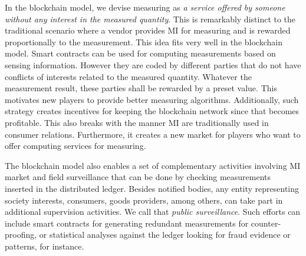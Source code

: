 \documentclass[journal]{IEEEtran}
\begin{document}
In the blockchain model, we devise measuring as \emph{a service offered by someone without any interest in the measured quantity}. 
This is remarkably distinct to the traditional scenario where a vendor provides MI for measuring and is rewarded proportionally to the measurement. 
This idea fits very well in the blockchain model. 
Smart contracts can be used for computing measurements based on sensing information. 
However they are coded by different parties that do not have conflicts of interests related to the measured quantity.
Whatever the measurement result, these parties shall be rewarded by a preset value. 
This motivates new players to provide better measuring algorithms.
Additionally, such strategy creates incentives for keeping the blockchain network since that becomes profitable. 
This also breaks with the manner MI are traditionally used in consumer relations.
Furthermore, it creates a new market for players who want to offer computing services for measuring. 

The blockchain model also enables a set of complementary activities involving MI market and field surveillance that can be done by checking measurements inserted in the distributed ledger.
Besides notified bodies, any entity representing society interests, consumers, goods providers, among others, can take part in additional supervision activities.
We call that \emph{public surveillance}.
Such efforts can include smart contracts for generating redundant measurements for counter-proofing, or statistical analyses against the ledger looking for fraud evidence or patterns, for instance.



\end{document}
